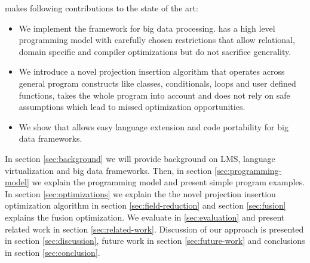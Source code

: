 \tool makes following contributions to the state of the art:    
\begin{itemize}

  \item We implement the \tool framework for big data processing. \tool has a high level programming model with carefully chosen restrictions that allow relational, domain specific and compiler optimizations but do not sacrifice generality.

  \item We introduce a novel projection insertion algorithm that operates across general program constructs like classes, conditionals, loops and user defined functions, takes the whole program into account and does not rely on safe assumptions which lead to missed optimization opportunities.  

  \item We show that \tool allows easy language extension and code portability for big data frameworks. 

\end{itemize} 

In section \ref{sec:background} we will provide background on LMS, language virtualization and big data frameworks. Then, in section \ref{sec:programming-model} we explain the programming model and present simple program examples. In section \ref{sec:optimizations} we explain the the novel projection insertion optimization algorithm in section \ref{sec:field-reduction} and section \ref{sec:fusion} explains the fusion optimization. We evaluate \tool in \ref{sec:evaluation} and present related work in section \ref{sec:related-work}. Discussion of our approach is presented in section \ref{sec:discussion}, future work in section \ref{sec:future-work} and conclusions in section \ref{sec:conclusion}.
